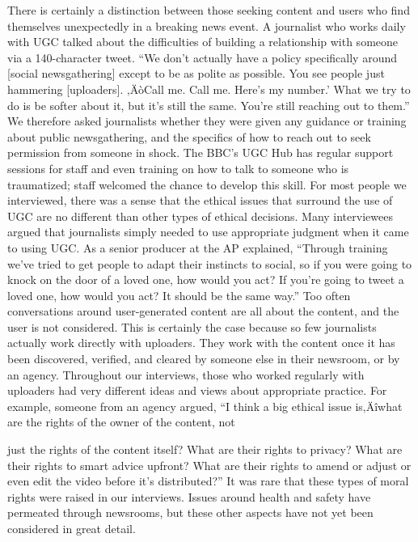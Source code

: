 \documentclass[symmetric, notoc, nobib]{towcenter-book}
\begin{document}
There is certainly a distinction between those seeking content and users
who find themselves unexpectedly in a breaking news event. A journalist
who works daily with UGC talked about the difficulties of building a relationship
with someone via a 140-character tweet. ``We don't actually have
a policy specifically around [social newsgathering] except to be as polite
as possible. You see people just hammering [uploaders]. ‚ÄòCall me. Call me.
Here's my number.' What we try to do is be softer about it, but it's still the
same. You're still reaching out to them.''
We therefore asked journalists whether they were given any guidance or
training about public newsgathering, and the specifics of how to reach out
to seek permission from someone in shock. The BBC's UGC Hub has regular
support sessions for staff and even training on how to talk to someone
who is traumatized; staff welcomed the chance to develop this skill.
For most people we interviewed, there was a sense that the ethical issues
that surround the use of UGC are no different than other types of ethical
decisions. Many interviewees argued that journalists simply needed to use
appropriate judgment when it came to using UGC. As a senior producer at
the AP explained, ``Through training we've tried to get people to adapt their
instincts to social, so if you were going to knock on the door of a loved one,
how would you act? If you're going to tweet a loved one, how would you act?
It should be the same way.''
Too often conversations around user-generated content are all about the
content, and the user is not considered. This is certainly the case because
so few journalists actually work directly with uploaders. They work with the
content once it has been discovered, verified, and cleared by someone else
in their newsroom, or by an agency. Throughout our interviews, those who
worked regularly with uploaders had very different ideas and views about
appropriate practice. For example, someone from an agency argued, ``I think
a big ethical issue is‚Äîwhat are the rights of the owner of the content, not

just the rights of the content itself? What are their rights to privacy? What
are their rights to smart advice upfront? What are their rights to amend or
adjust or even edit the video before it's distributed?''
It was rare that these types of moral rights were raised in our interviews.
Issues around health and safety have permeated through newsrooms, but
these other aspects have not yet been considered in great detail.
\end{document}
